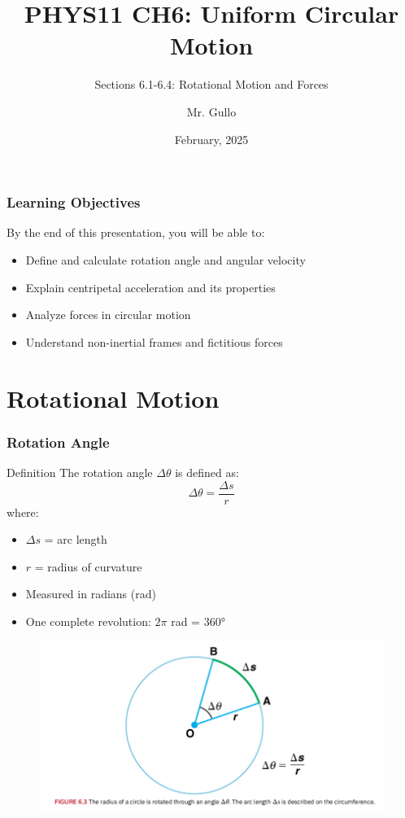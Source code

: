 \documentclass{beamer}
\title[Circular Motion]{PHYS11 CH6: Uniform Circular Motion}
\subtitle{Sections 6.1-6.4: Rotational Motion and Forces}
\author[Mr. Gullo]{Mr. Gullo}
\date[Feb 2025]{February, 2025}
\institute{Physics Department}
\begin{document}
\frame{\titlepage}

\begin{frame}
\frametitle{Learning Objectives}
\begin{block}{By the end of this presentation, you will be able to:}
\begin{itemize}
\item Define and calculate rotation angle and angular velocity
\item Explain centripetal acceleration and its properties
\item Analyze forces in circular motion
\item Understand non-inertial frames and fictitious forces
\end{itemize}
\end{block}
\end{frame}

\section{Rotational Motion}

\begin{frame}
\frametitle{Rotation Angle}
\begin{block}{Definition}
The rotation angle $\Delta\theta$ is defined as:
\[ \Delta\theta = \frac{\Delta s}{r} \]
where:
\begin{itemize}
\item $\Delta s$ = arc length
\item $r$ = radius of curvature
\end{itemize}
\end{block}
\begin{itemize}
\item Measured in radians (rad)
\item One complete revolution: $2\pi$ rad = 360°
\end{itemize}
\end{frame}

\begin{frame}
\begin{figure}
    \centering
    \includegraphics[width=1\linewidth]{CH6/arc.png}
\end{figure}
\end{frame}
\end{document}
